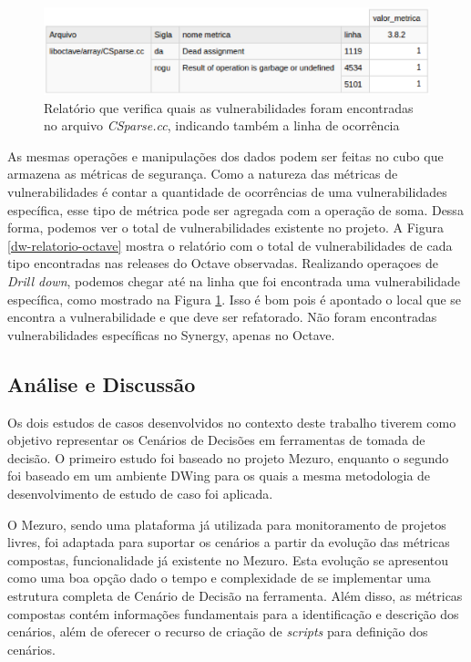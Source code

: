 \begin{figure}[H]
	\centering
	\includegraphics[scale=0.7]{figuras/dw-sec-octave}
	\caption{Relatório que verifica quais as vulnerabilidades foram encontradas no arquivo \emph{CSparse.cc}, indicando também a linha de ocorrência}
	\label{dw-sec-octave}
\end{figure}

As mesmas operações e manipulações dos dados podem ser feitas no cubo que armazena as métricas de segurança. Como a natureza das métricas de vulnerabilidades é contar a quantidade de ocorrências de uma vulnerabilidades específica, esse tipo de métrica pode ser agregada com a operação de soma. Dessa forma, podemos ver o total de vulnerabilidades existente no projeto. A Figura \ref{dw-relatorio-octave} mostra o relatório com o total de vulnerabilidades de cada tipo encontradas nas releases do Octave observadas. Realizando operaçoes de \emph{Drill down}, podemos chegar até na linha que foi encontrada uma vulnerabilidade específica, como mostrado na Figura \ref{dw-sec-octave}. Isso é bom pois é apontado o local que se encontra a vulnerabilidade e que deve ser refatorado. Não foram encontradas vulnerabilidades específicas no Synergy, apenas no Octave.


\subsection{Análise e Discussão}
\label{ana-disc}

Os dois estudos de casos desenvolvidos no contexto deste trabalho tiverem como objetivo representar os Cenários de Decisões em ferramentas de tomada de decisão. O primeiro estudo foi baseado no projeto Mezuro, enquanto o segundo foi baseado em um ambiente DWing para os quais a mesma metodologia de desenvolvimento de estudo de caso foi aplicada. 

O Mezuro, sendo uma plataforma já utilizada para monitoramento de projetos livres, foi adaptada para suportar os cenários a partir da evolução das métricas compostas, funcionalidade já existente no Mezuro. Esta evolução se apresentou como uma boa opção dado o tempo e complexidade de se implementar uma estrutura completa de Cenário de Decisão na ferramenta. Além disso, as métricas compostas contém informações fundamentais para a identificação e descrição dos cenários, além de oferecer o recurso de criação de \emph{scripts} para definição dos cenários.

